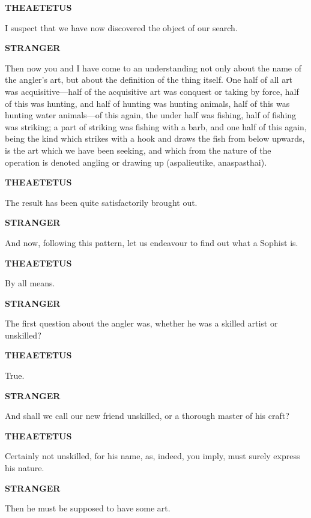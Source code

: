 \documentclass[11pt,letter]{article}
\begin{document}
\par \textbf{THEAETETUS}
\par   I suspect that we have now discovered the object of our search.

\par \textbf{STRANGER}
\par   Then now you and I have come to an understanding not only about the name of the angler's art, but about the definition of the thing itself. One half of all art was acquisitive—half of the acquisitive art was conquest or taking by force, half of this was hunting, and half of hunting was hunting animals, half of this was hunting water animals—of this again, the under half was fishing, half of fishing was striking; a part of striking was fishing with a barb, and one half of this again, being the kind which strikes with a hook and draws the fish from below upwards, is the art which we have been seeking, and which from the nature of the operation is denoted angling or drawing up (aspalieutike, anaspasthai).

\par \textbf{THEAETETUS}
\par   The result has been quite satisfactorily brought out.

\par \textbf{STRANGER}
\par   And now, following this pattern, let us endeavour to find out what a Sophist is.

\par \textbf{THEAETETUS}
\par   By all means.

\par \textbf{STRANGER}
\par   The first question about the angler was, whether he was a skilled artist or unskilled?

\par \textbf{THEAETETUS}
\par   True.

\par \textbf{STRANGER}
\par   And shall we call our new friend unskilled, or a thorough master of his craft?

\par \textbf{THEAETETUS}
\par   Certainly not unskilled, for his name, as, indeed, you imply, must surely express his nature.

\par \textbf{STRANGER}
\par   Then he must be supposed to have some art.
\end{document}
